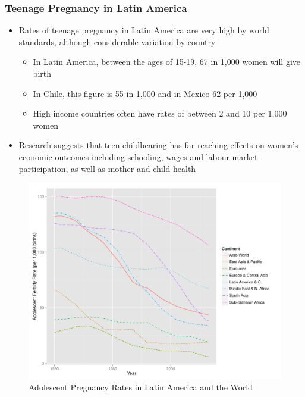 \documentclass[10pt,letterpaper,subeqn]{beamer}
\begin{document}
\begin{frame}[label=teenPreg]
  \frametitle{Teenage Pregnancy in Latin America}
\vspace{4mm}
\begin{itemize}
\item Rates of teenage pregnancy in Latin America are very high by world standards, 
although considerable variation by country
\begin{itemize}
\item In Latin America, between the ages of 15-19, 67 in 1,000 women will give birth
\item In Chile, this figure is 55 in 1,000 and in Mexico 62 per 1,000
\item High income countries often have rates of between 2 and 10 per 1,000 women
\end{itemize}
\vspace{3mm}
\item Research suggests that teen childbearing has far reaching effects on women's
economic outcomes including schooling, wages and labour market participation, as 
well as mother and child health
\end{itemize}
\end{frame}

\begin{frame}[label=cont]
\begin{figure}
\begin{center}
\caption{Adolescent Pregnancy Rates in Latin America and the World}
\includegraphics[scale=0.45]{./figures/Continents.pdf}
\end{center}
\end{figure}
\end{frame}
\end{document}
